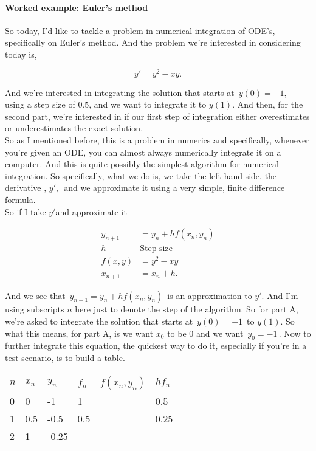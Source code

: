 \paragraph{Worked example: Euler's method}
So today, I'd like to tackle a problem
in numerical integration of ODE's, specifically on Euler's method.
And the problem we're interested in considering today
is,

\begin{equation*}
  y' = y^2 - xy. 
\end{equation*}

And we're interested in integrating the solution
that starts at $\, y(0) = -1 ,\,$ using a step size of $0.5$,
and we want to integrate it to $y(1)$.
And then, for the second part, we're interested in if our first step of integration
either overestimates or underestimates the exact solution. \\

So as I mentioned before, this is a problem in numerics
and specifically, whenever you're given an ODE,
you can almost always numerically
integrate it on a computer.
And this is quite possibly the simplest algorithm for numerical integration.
So specifically, what we do is, we take the left-hand side,
the derivative $, \, y' ,\,$ and we approximate it using a very simple,
finite difference formula. \\
So if I take $y'$and approximate it

\begin{align*}
  y_{n + 1} &= y_n + hf(x_n , y_n) \\
  h \qquad &\text{Step size} \\
  f(x, y) &= y^2 - xy \\
  x_{n + 1} &= x_n + h. 
\end{align*}

And we see that $\, y_{n + 1} = y_n + hf(x_n , y_n) \,$
is an approximation to $y'$.
And I'm using subscripts $n$ here just to denote the step of the algorithm.
So for part A, we're asked to integrate the solution
that starts at $\, y(0) = -1\,$ to $y(1)$.
So what this means, for part A, is we want $x_0$  to be $0$
and we want $\, y_0 = -1 \,$. 
Now to further integrate this equation, the quickest way
to do it, especially if you're in a test scenario, is to build a table.

\begin{table}[ht!]
  \centering
  \begin{tabular}{lllll}
    $n$ & $x_n$ & $y_n$ & $f_n = f(x_n, y_n)$ & $ h f_n$ \\
    0  & 0     & -1     &  1   &  0.5    \\
    1  & 0.5   & -0.5   & 0.5 &  0.25   \\
    2  & 1   & -0.25  & &  
  \end{tabular}
\end{table}

